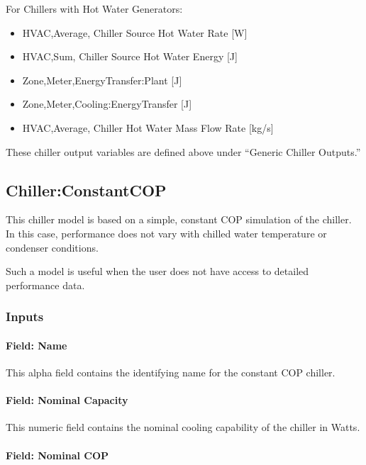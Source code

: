 For Chillers with Hot Water Generators:

\begin{itemize}
    \item
    HVAC,Average, Chiller Source Hot Water Rate {[}W{]}
    \item
    HVAC,Sum, Chiller Source Hot Water Energy {[}J{]}
    \item
    Zone,Meter,EnergyTransfer:Plant {[}J{]}
    \item
    Zone,Meter,Cooling:EnergyTransfer {[}J{]}
    \item
    HVAC,Average, Chiller Hot Water Mass Flow Rate {[}kg/s{]}
\end{itemize}

These chiller output variables are defined above under ``Generic Chiller Outputs.''

\subsection{Chiller:ConstantCOP}\label{chillerconstantcop}

This chiller model is based on a simple, constant COP simulation of the chiller. In this case, performance does not vary with chilled water temperature or condenser conditions.

Such a model is useful when the user does not have access to detailed performance data.

\subsubsection{Inputs}\label{inputs-2-030}

\paragraph{Field: Name}\label{field-name-2-029}

This alpha field contains the identifying name for the constant COP chiller.

\paragraph{Field: Nominal Capacity}\label{field-nominal-capacity-2-000}

This numeric field contains the nominal cooling capability of the chiller in Watts.

\paragraph{Field: Nominal COP}\label{field-nominal-cop-000}

